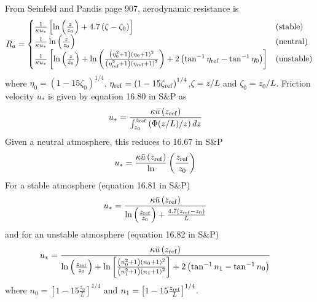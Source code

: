 \documentclass{article}
\begin{document}
From Seinfeld and Pandis page 907, aerodynamic resistance is
\[R_a =\begin{cases}
\frac{1}{\kappa u_*}\left[\ln \left(\frac{z}{z_0}\right)
  + 4.7 \left(\zeta - \zeta_0\right)\right] & \textrm{(stable)} \\
\frac{1}{\kappa u_*} \ln \left( \frac{z}{z_0} \right)& \textrm{(neutral)} \\
\frac{1}{\kappa u_*} \left[ \ln \left( \frac{z}{z_0} \right)
  + \ln \left( \frac{\left(\eta_0^2 +1\right)\left(\eta_0 + 1\right)^2}
  {\left(\eta_{\rm ref}^2 + 1 \right)\left(\eta_{\rm ref} + 1 \right)^2}\right)
  + 2 \left(\tan^{-1} \eta_{\rm ref} - \tan^{-1} \eta_0 \right)\right]
& \textrm{(unstable)}\\
\end{cases}\]
where $\eta_0 = \left(1 - 15 \zeta_0\right)^{1/4}$, 
$\eta_{\rm ref} = \left(1-15\zeta_{\rm ref}\right)^{1/4}$,$\zeta = z/L$
and $\zeta_0 = z_0 / L$.
Friction velocity $u_{*}$ is given by equation 16.80 in S\&P as
\begin{align}
u_* & = \frac{\kappa \bar{u}\left(z_{\rm ref}\right)}
  {\int_{z_0}^{z_{\rm ref}} \left(\Phi (z/L)/z\right)dz}
\end{align}
Given a neutral atmosphere, this reduces to 16.67 in S\&P
\begin{align}
u_* & = \frac{\kappa \bar{u}\left(z_{\rm ref}\right)}
  \ln \left(\frac{z_{\rm ref}}{z_0}\right)
\end{align}
For a stable atmosphere (equation 16.81 in S\&P)
\begin{align}
u_* & = \frac{\kappa \bar{u} \left(z_{\rm ref}\right)}
  {\ln \left(\frac{z_{\rm ref}}{z_0}\right)  
  + \frac{4.7\left(z_{\rm ref} - z_0\right)}{L}}
\end{align}
and for an unstable atmosphere (equation 16.82 in S\&P)
\begin{align}
u_* & = \frac{\kappa \bar{u} \left(z_{\rm ref}\right)}
  {\ln \left(\frac{z_{\rm ref}}{z_0}\right) +
  \ln \left[\frac{\left(n_0^2 + 1 \right)\left(n_0 + 1\right)^2}
  {\left(n_1^2 + 1 \right)\left(n_1 + 1\right)^2}\right]
  + 2 \left(\tan^{-1}n_1 - \tan^{-1}n_0\right)}
\end{align}
where $n_0 = \left[1 - 15 \frac{z_0}{L}\right]^{1/4}$ and
$n_1 = \left[ 1 - 15 \frac{z_{\rm ref}}{L}\right]^{1/4}$.
\end{document}
